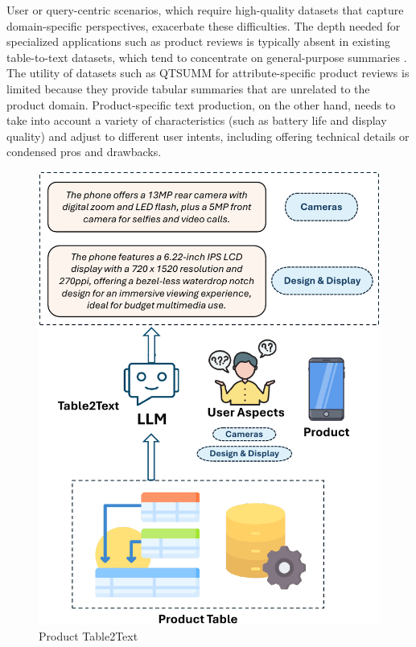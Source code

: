 User or query-centric scenarios, which require high-quality datasets that capture domain-specific perspectives, exacerbate these difficulties. The depth needed for specialized applications such as product reviews is typically absent in existing table-to-text datasets, which tend to concentrate on general-purpose summaries \citep{macková2023promapdatasetsproductmapping}. The utility of datasets such as QTSUMM \citep{zhao2023qtsummqueryfocusedsummarizationtabular} for attribute-specific product reviews is limited because they provide tabular summaries that are unrelated to the product domain. Product-specific text production, on the other hand, needs to take into account a variety of characteristics (such as battery life and display quality) and adjust to different user intents, including offering technical details or condensed pros and drawbacks.
\begin{figure}[H]
    \centering
    \includegraphics[scale = 0.60]{images/task-def.pdf}
    \caption{Product Table2Text}
    \label{fig:task-def}
\end{figure}
